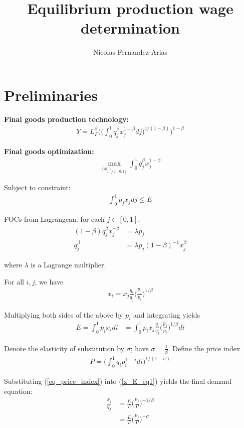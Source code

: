 \documentclass[12pt,english]{article}
\theoremstyle{remark}
\begin{document}
\title{Equilibrium production wage determination}
\author{Nicolas Fernandez-Arias}
\maketitle

\section{Preliminaries}
\textbf{Final goods production technology:}
\begin{align}
Y = L_F^{\beta}\Bigg( \Big(\int_0^1 q_j^{\beta} x_j^{1-\beta} dj \Big)^{1/(1-\beta)} \Bigg)^{1-\beta} \label{final_good_technology}
\end{align}

\textbf{Final goods optimization:}
\begin{align*}
\max_{\{x_j\}_{j\in [0,1]}} \int_0^1 q_j^{\beta} x_j^{1-\beta} 
\end{align*}

Subject to constraint:  
\begin{align*}
\int_0^1 p_j x_j dj \le E
\end{align*}

FOCs from Lagrangean: for each $j \in [0,1]$, 
\begin{align*}
(1-\beta)q_j^{\beta} x_j^{-\beta} &= \lambda p_j \\
					 q_j^{\beta}  &= \lambda p_j (1-\beta)^{-1} x_j^{\beta}
\end{align*}

where $\lambda$ is a Lagrange multiplier.

For all $i,j$, we have 
\begin{align*}
x_i = x_j \frac{q_i}{q_j} \Big(\frac{p_j}{p_i}\Big)^{1/\beta}
\end{align*}

Multiplying both sides of the above by $p_i$ and integrating yields
\begin{align}
E = \int_0^1 p_i x_i di &= \int_0^1 p_i x_j \frac{q_i}{q_j} \Big(\frac{p_j}{p_i}\Big)^{1/\beta} di \label{x_E_eq1}
\end{align}

Denote the elasticity of substitution by $\sigma$; have $\sigma = \frac{1}{\beta}$. Define the price index
\begin{align}
P = \Big(\int_0^1 q_i p_i^{1-\sigma} di \Big)^{1/(1-\sigma)} \label{eq_price_index}
\end{align}

Substituting (\ref{eq_price_index}) into (\ref{x_E_eq1}) yields the final demand equation:
\begin{align}
\frac{x_j}{q_j} &= \frac{E}{P} \Big(\frac{p_j}{P}\Big)^{-1/\beta} \label{eq_x_demand_betaversion} \\
			    &= \frac{E}{P} \Big(\frac{p_j}{P}\Big)^{-\sigma} \label{eq_x_demand}
\end{align}
\end{document}
